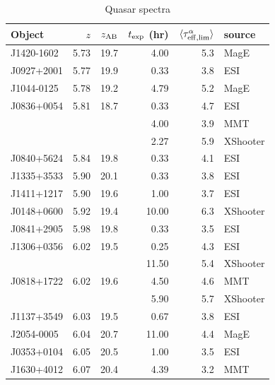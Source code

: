 \begin{table}
 \begin{center}
 \caption{Quasar spectra\label{tab:speclist}}
 \begin{tabular}{lrrrrl}
 \hline
 Object & $z$ & $z_{\rm AB}$ & $t_{\rm exp}$ (hr) & $\langle\tau_{\rm eff,lim}^\alpha\rangle$ & source \\
 \hline
J1420-1602 &    5.73 &   19.7 &    4.00 &    5.3 & MagE \\
J0927+2001 &    5.77 &   19.9 &    0.33 &    3.8 & ESI \\
J1044-0125 &    5.78 &   19.2 &    4.79 &    5.2 & MagE \\
J0836+0054 &    5.81 &   18.7 &    0.33 &    4.7 & ESI \\
           &         &        &    4.00 &    3.9 & MMT \\
           &         &        &    2.27 &    5.9 & XShooter \\
J0840+5624 &    5.84 &   19.8 &    0.33 &    4.1 & ESI \\
J1335+3533 &    5.90 &   20.1 &    0.33 &    3.8 & ESI \\
J1411+1217 &    5.90 &   19.6 &    1.00 &    3.7 & ESI \\
J0148+0600 &    5.92 &   19.4 &   10.00 &    6.3 & XShooter \\
J0841+2905 &    5.98 &   19.8 &    0.33 &    3.5 & ESI \\
J1306+0356 &    6.02 &   19.5 &    0.25 &    4.3 & ESI \\
           &         &        &   11.50 &    5.4 & XShooter \\
J0818+1722 &    6.02 &   19.6 &    4.50 &    4.6 & MMT \\
           &         &        &    5.90 &    5.7 & XShooter \\
J1137+3549 &    6.03 &   19.5 &    0.67 &    3.8 & ESI \\
J2054-0005 &    6.04 &   20.7 &   11.00 &    4.4 & MagE \\
J0353+0104 &    6.05 &   20.5 &    1.00 &    3.5 & ESI \\
J1630+4012 &    6.07 &   20.4 &    4.39 &    3.2 & MMT \\

\end{tabular}
\end{center}
\end{table}
